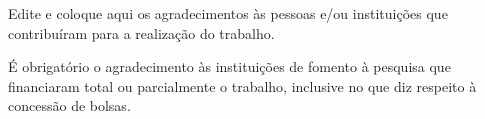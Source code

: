 
\begin{agradecimentos}

    Edite e coloque aqui os agradecimentos às pessoas e/ou instituições que contribuíram para a realização do trabalho.

    É obrigatório o agradecimento às instituições de fomento à pesquisa que financiaram total ou parcialmente o trabalho, inclusive no que diz respeito à concessão de bolsas.

\end{agradecimentos}
